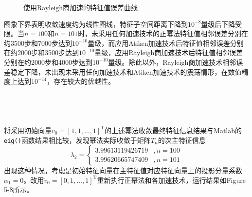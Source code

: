 \documentclass[UTF8,a4paper,10pt]{ctexart}
\begin{document}
        \begin{figure}[htbp]
            \centering
            \caption{使用Rayleigh商加速的特征值误差曲线}
        \end{figure}
        \par
        图象下界表明收敛速度约为线性图线，特征子空间距离下降到$10^{-8}$量级后下降受限。当$n=100$和$n=101$时，未采用任何加速技术的正幂法特征值相邻误差分别在约3500步和7000步达到$10^{-10}$量级，而应用Atiken加速技术后特征值相邻误差分别在约2000步和3500步达到$10^{-10}$量级，应用Rayleigh商加速技术后特征值相邻误差分别在约2000步和4000步达到$10^{-10}$量级。除此以外，Rayleigh商加速技术相邻误差稳定下降，未出现未采用任何加速技术和Atiken加速技术的震荡情形，在数值精度上达到$10^{-14}$，存在较大的优越性。
        \par
        \ 
        \par
        \ 
        \par
        将采用初始向量$v_0=[1,1,\dots,1]^{\mathrm{T}}$的上述幂法收敛最终特征信息结果与Matlab的\texttt{eig()}函数结果相比较，发现幂法实际收敛于矩阵$T_n$的次主特征信息
        $$
        \lambda_2=
        \begin{cases}
            3.99613119426719&,n=100 \\
            3.99620665747409&,n=101
        \end{cases}
        $$
        出现这种情况，考虑是初始特征向量在主特征值对应特征向量上的投影分量系数$\alpha_1=0$。改用$\tilde{v}_0=[0,1,\dots,1]^{\mathrm{T}}$重新执行正幂法和各加速技术，运行结果如Figure 5-8所示。
\end{document}
